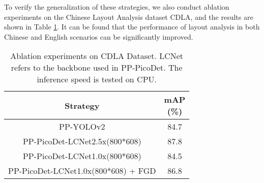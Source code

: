 \documentclass[letterpaper]{article} \usepackage{aaai21}  \usepackage{times}  \usepackage{helvet} \usepackage{courier}  \usepackage[hyphens]{url}  \usepackage{graphicx} \usepackage{algorithm}
\begin{document}
To verify the generalization of these strategies, we also conduct ablation experiments on the Chinese Layout Analysis dataset CDLA, and the results are shown in Table \ref{Ablation_CDLA}. It can be found that the performance of layout analysis in both Chinese and English scenarios can be significantly improved.


\begin{table}[t]
\begin{center}
\end{center}
\caption{Ablation experiments on PubLayNet dataset. \textbf{LCNet} refers to the backbone used in PP-PicoDet. The inference speed is tested on CPU.}
\label{Ablation_PubLayNet}
\end{table}


\begin{table}[t]
\begin{center}
\begin{tabular}{c|c}
\hline
Strategy & \makecell{mAP \\ (\%)}\\
\hline
PP-YOLOv2 &	84.7 \\
PP-PicoDet-LCNet2.5x(800*608)  &	87.8 \\
PP-PicoDet-LCNet1.0x(800*608)  &	84.5 \\
PP-PicoDet-LCNet1.0x(800*608) + FGD &	86.8 \\
\hline
\end{tabular}
\end{center}
\caption{Ablation experiments on CDLA Dataset. LCNet refers to the backbone used in PP-PicoDet. The inference speed is tested on CPU.}
\label{Ablation_CDLA}
\end{table}
\end{document}
